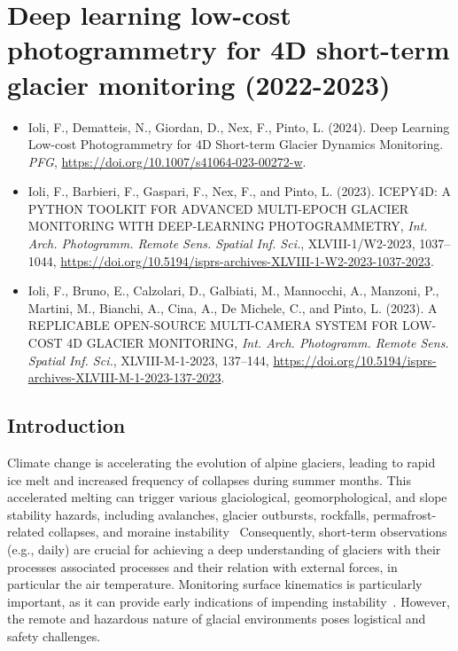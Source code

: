 \graphicspath{{figures/chapter4/}}
\onehalfspacing

\chapter{Deep learning low-cost photogrammetry for 4D short-term glacier monitoring
  (2022-2023)}

\vfill


\begin{itemize}
  \item Ioli, F., Dematteis, N., Giordan, D., Nex, F., Pinto, L. (2024). Deep Learning Low-cost Photogrammetry for 4D Short-term Glacier Dynamics Monitoring. \textit{PFG}, \footnotesize{\url{https://doi.org/10.1007/s41064-023-00272-w}}.
  \item Ioli, F., Barbieri, F., Gaspari, F., Nex, F., and Pinto, L. (2023). ICEPY4D: A PYTHON TOOLKIT FOR ADVANCED MULTI-EPOCH GLACIER MONITORING WITH DEEP-LEARNING PHOTOGRAMMETRY, \textit{Int. Arch. Photogramm. Remote Sens. Spatial Inf. Sci.}, XLVIII-1/W2-2023, 1037–1044, \footnotesize{\url{https://doi.org/10.5194/isprs-archives-XLVIII-1-W2-2023-1037-2023}}.
  \item Ioli, F., Bruno, E., Calzolari, D., Galbiati, M., Mannocchi, A., Manzoni, P., Martini, M., Bianchi, A., Cina, A., De Michele, C., and Pinto, L. (2023). A REPLICABLE OPEN-SOURCE MULTI-CAMERA SYSTEM FOR LOW-COST 4D GLACIER MONITORING, \textit{Int. Arch. Photogramm. Remote Sens. Spatial Inf. Sci.}, XLVIII-M-1-2023, 137–144, \footnotesize{\url{https://doi.org/10.5194/isprs-archives-XLVIII-M-1-2023-137-2023}}.
\end{itemize}

\newpage

\section{Introduction}\label{sec:4:intro}

Climate change is accelerating the evolution of alpine glaciers, leading to rapid ice melt and increased frequency of collapses during summer months. 
This accelerated melting can trigger various glaciological, geomorphological, and slope stability hazards, including avalanches, glacier outbursts, rockfalls, permafrost-related collapses, and moraine instability~\citep{Kaab2005, chiarle2023, Nigrelli2024}
Consequently, short-term observations (e.g., daily) are crucial for achieving a deep understanding of glaciers with their processes associated processes and their relation with external forces, in particular the air temperature.
Monitoring surface kinematics is particularly important, as it can provide early indications of impending instability~\citep{Faillettaz2015}.
However, the remote and hazardous nature of glacial environments poses logistical and safety challenges. 

